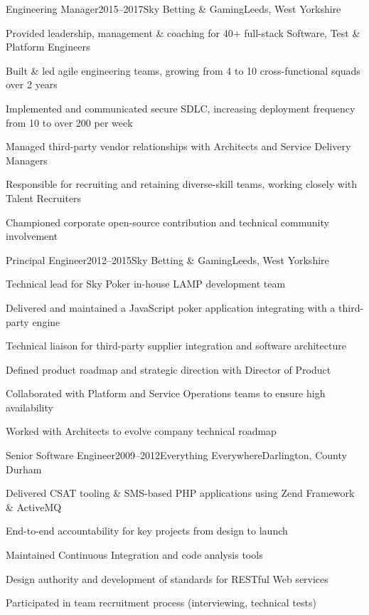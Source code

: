 \documentclass{cv}
\begin{document}

\begin{experience}{Engineering Manager}{2015--2017}{Sky Betting \& Gaming}{Leeds, West Yorkshire}
\item Provided leadership, management \& coaching for 40+ full-stack Software, Test \& Platform Engineers
\item Built \& led agile engineering teams, growing from 4 to 10 cross-functional squads over 2 years
\item Implemented and communicated secure SDLC, increasing deployment frequency from 10 to over 200 per week
\item Managed third-party vendor relationships with Architects and Service Delivery Managers
\item Responsible for recruiting and retaining diverse-skill teams, working closely with Talent Recruiters
\item Championed corporate open-source contribution and technical community involvement
\end{experience}


\begin{experience}{Principal Engineer}{2012--2015}{Sky Betting \& Gaming}{Leeds, West Yorkshire}
\item Technical lead for Sky Poker in-house LAMP development team
\item Delivered and maintained a JavaScript poker application integrating with a third-party engine
\item Technical liaison for third-party supplier integration and software architecture
\item Defined product roadmap and strategic direction with Director of Product
\item Collaborated with Platform and Service Operations teams to ensure high availability
\item Worked with Architects to evolve company technical roadmap
\end{experience}


\begin{experience}{Senior Software Engineer}{2009--2012}{Everything Everywhere}{Darlington, County Durham}
\item Delivered CSAT tooling \& SMS-based PHP applications using Zend Framework \& ActiveMQ
\item End-to-end accountability for key projects from design to launch
\item Maintained Continuous Integration and code analysis tools
\item Design authority and development of standards for RESTful Web services
\item Participated in team recruitment process (interviewing, technical tests)
\end{experience}
\end{document}

